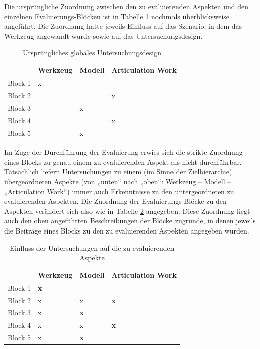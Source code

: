 Die ursprüngliche Zuordnung zwischen den zu evaluierenden Aspekten und den einzelnen Evaluierungs-Blöcken ist in Tabelle \ref{tab:evaluierungsMatrixOriginal} nochmals überblicksweise angeführt. Die Zuordnung hatte jeweils Einfluss auf das Szenario, in dem das Werkzeug angewandt wurde sowie auf das Untersuchungsdesign.

\begin{table}[htbp]
	\centering
	\caption{Ursprüngliches globales Untersuchungsdesign}
	\begin{tabular}{| p{3cm} || p{2cm} | p{2cm} | p{2cm} |} \hline
		 & Werkzeug & Modell & Articulation Work \\ \hline \hline
		 Block 1 & x &  &   \\ \hline
		 Block 2 &  &  & x  \\ \hline
		 Block 3 &  & x &   \\ \hline
		 Block 4 &  &  & x  \\ \hline
		 Block 5 &  & x &   \\ \hline
	\end{tabular}
	\label{tab:evaluierungsMatrixOriginal}
\end{table}

Im Zuge der Durchführung der Evaluierung erwies sich die strikte Zuordnung eines Blocks zu genau einem zu evaluierenden Aspekt als nicht durchführbar. Tatsächlich liefern Untersuchungen zu einem (im Sinne der Zielhierarchie) übergeordneten Aspekte (von „unten“ nach „oben“: Werkzeug -- Modell -- „Articulation Work“) immer auch Erkenntnisse zu den untergeordneten zu evaluierenden Aspekten. Die Zuordnung der Evaluierungs-Blöcke zu den Aspekten verändert sich also wie in Tabelle \ref{tab:evaluierungsMatrix} angegeben. Diese Zuordnung liegt auch den oben angeführten Beschreibungen der Blöcke zugrunde, in denen jeweils die Beiträge eines Blocks zu den zu evaluierenden Aspekten angegeben wurden.

\begin{table}[htbp]
	\centering
	\caption{Einfluss der Untersuchungen auf die zu evaluierenden Aspekte}
	\begin{tabular}{| p{3cm} || p{2cm} | p{2cm} | p{2cm} |} \hline
		 & Werkzeug & Modell & Articulation Work \\ \hline \hline
		 Block 1 & \textbf{x} &  &   \\ \hline
		 Block 2 & x & x & \textbf{x}  \\ \hline
		 Block 3 & x & \textbf{x} &   \\ \hline
		 Block 4 & x & x & \textbf{x}  \\ \hline
		 Block 5 & x & \textbf{x} &   \\ \hline
	\end{tabular}
	\label{tab:evaluierungsMatrix}
\end{table}

